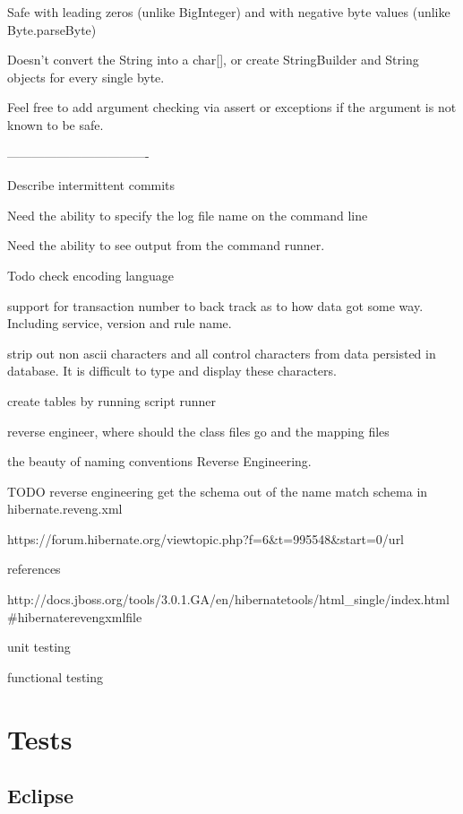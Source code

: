 \documentclass[a4paper,10pt]{book}
\begin{document}
Safe with leading zeros (unlike BigInteger) and with negative byte values (unlike Byte.parseByte)

Doesn't convert the String into a char[], or create StringBuilder and String objects for every single byte.

Feel free to add argument checking via assert or exceptions if the argument is not known to be safe.

----------------------------------

Describe intermittent commits

Need the ability to specify the log file name on the command line

Need the ability to see output from the command runner.

Todo check encoding language 

support for transaction number to back track as to how data got some way.  Including service, version and rule name.

strip out non ascii characters and all control characters from data persisted in database.  It is difficult to type and display these characters.


create tables by running script runner

reverse engineer, where should the class files go and the mapping files

the beauty of naming conventions  Reverse Engineering.

TODO
   reverse engineering get the schema out of the name  
   match schema in hibernate.reveng.xml

https://forum.hibernate.org/viewtopic.php?f=6&t=995548&start=0/url

references

http://docs.jboss.org/tools/3.0.1.GA/en/hibernatetools/html_single/index.html#hibernaterevengxmlfile

unit testing 

functional testing

\chapter{Tests}
\section{Eclipse}
\end{document}

